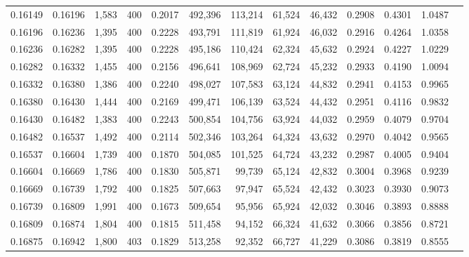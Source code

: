 \begin{tabular}{rrrrrrrrrrrrr}
0.16149 & 0.16196 &  1,583 &   400 &                                     0.2017 & 492,396 & 113,214 &  61,524 &  46,432 & 0.2908 & 0.4301 & 1.0487 \\
0.16196 & 0.16236 &  1,395 &   400 &                                     0.2228 & 493,791 & 111,819 &  61,924 &  46,032 & 0.2916 & 0.4264 & 1.0358 \\
0.16236 & 0.16282 &  1,395 &   400 &                                     0.2228 & 495,186 & 110,424 &  62,324 &  45,632 & 0.2924 & 0.4227 & 1.0229 \\
0.16282 & 0.16332 &  1,455 &   400 &                                     0.2156 & 496,641 & 108,969 &  62,724 &  45,232 & 0.2933 & 0.4190 & 1.0094 \\
0.16332 & 0.16380 &  1,386 &   400 &                                     0.2240 & 498,027 & 107,583 &  63,124 &  44,832 & 0.2941 & 0.4153 & 0.9965 \\
0.16380 & 0.16430 &  1,444 &   400 &                                     0.2169 & 499,471 & 106,139 &  63,524 &  44,432 & 0.2951 & 0.4116 & 0.9832 \\
0.16430 & 0.16482 &  1,383 &   400 &                                     0.2243 & 500,854 & 104,756 &  63,924 &  44,032 & 0.2959 & 0.4079 & 0.9704 \\
0.16482 & 0.16537 &  1,492 &   400 &                                     0.2114 & 502,346 & 103,264 &  64,324 &  43,632 & 0.2970 & 0.4042 & 0.9565 \\
0.16537 & 0.16604 &  1,739 &   400 &                                     0.1870 & 504,085 & 101,525 &  64,724 &  43,232 & 0.2987 & 0.4005 & 0.9404 \\
0.16604 & 0.16669 &  1,786 &   400 &                                     0.1830 & 505,871 &  99,739 &  65,124 &  42,832 & 0.3004 & 0.3968 & 0.9239 \\
0.16669 & 0.16739 &  1,792 &   400 &                                     0.1825 & 507,663 &  97,947 &  65,524 &  42,432 & 0.3023 & 0.3930 & 0.9073 \\
0.16739 & 0.16809 &  1,991 &   400 &                                     0.1673 & 509,654 &  95,956 &  65,924 &  42,032 & 0.3046 & 0.3893 & 0.8888 \\
0.16809 & 0.16874 &  1,804 &   400 &                                     0.1815 & 511,458 &  94,152 &  66,324 &  41,632 & 0.3066 & 0.3856 & 0.8721 \\
0.16875 & 0.16942 &  1,800 &   403 &                                     0.1829 & 513,258 &  92,352 &  66,727 &  41,229 & 0.3086 & 0.3819 & 0.8555 \\

\end{tabular}
